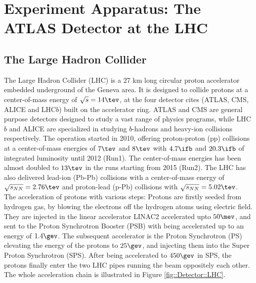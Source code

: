 \chapter{Experiment Apparatus:  The ATLAS Detector at the LHC} \label{sec::Detector}

\section{The Large Hadron Collider} 
The Large Hadron Collider (LHC) \cite{LHC} is a 27 km long circular proton accelerator embedded underground of the Geneva area.
It is designed to collide protons at a center-of-mass energy of $\sqrt{s} = 14 \tev$, at the four detector cites (ATLAS\cite{ATLAS_exp}, CMS\cite{CMS}, ALICE\cite{ALICE} and LHC$b$\cite{LHCb}) built on the accelerator ring. ATLAS and CMS are general purpose detectors designed to study a vast range of physics programs, while LHC$b$ and ALICE are specialized in studying $b$-hadrons and heavy-ion collisions respectively. 
The operation started in 2010, offering proton-proton (pp) collisions at a center-of-mass energies of $7\tev$ and $8\tev$ with $4.7\ifb$ and $20.3\ifb$ of integrated luminosity until 2012 (Run1). The center-of-mass energies has been almost doubled to $13\tev$
in the runs starting from 2015 (Run2). The LHC has also delivered lead-ion (Pb-Pb) collisions with a center-of-mass energy of $\sqrt{s_{NN}} = 2.76\tev$ and proton-lead (p-Pb) collisions with $\sqrt{s_{NN}} = 5.02\tev$. \\
% 


The acceleration of protons with various steps: 
Protons are firstly seeded from hydrogen gas, by blowing the electrons off the hydrogen atoms using electric field.
They are injected in the linear accelerator LINAC2 accelerated upto $50\mev$, and sent to the Proton Synchrotron Booster (PSB) with being accelerated up to an energy of $1.4\gev$. 
The subsequent accelerator is the Proton Synchrotron (PS) elevating the energy of the protons to $25\gev$, and injecting them into the Super Proton Synchrotron (SPS). After being accelerated to $450\gev$ in SPS, the protons finally enter the two LHC pipes running the beam oppositely each other. The whole acceleration chain is illustrated in Figure \ref{fig::Detector::LHC}. \\

